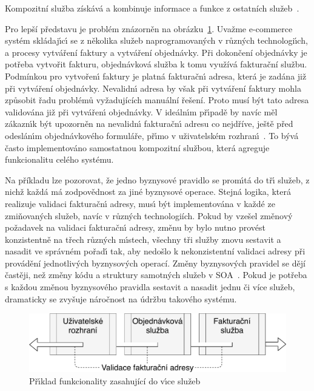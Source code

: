 \begin{definition}
    Kompozitní služba získává a kombinuje informace a funkce z ostatních služeb~\cite{papazoglou2003service}.
\end{definition}

Pro lepší představu je problém znázorněn na obrázku~\ref{fig:service-cutting}. Uvažme e-commerce
systém skládaj\'{\i}c\'{\i} se z několika služeb naprogramovan\'ych v různ\'ych technologi\'{\i}ch, a
procesy vytváření faktury a vytváření objednávky. Při dokončení objednávky je potřeba vytvořit fakturu,
objednávková služba k tomu využívá fakturační službu. Podmínkou pro vytvořen\'{\i} faktury je platná fakturačn\'{\i} adresa,
která je zadána již při vytváření objednávky. Nevalidn\'{\i} adresa by však při vytváření faktury
mohla způsobit řadu problémů vyžadujících manuální řešení. Proto musí být tato adresa validována
již při vytvářen\'{\i} objednávky. V ideáln\'{\i}m př\'{\i}padě by navíc měl zákazn\'{\i}k být upozorněn
na nevalidn\'{\i} fakturačn\'{\i} adresu co nejdříve, ještě před odeslán\'{\i}m objednávkového formuláře,
př\'{\i}mo v uživatelském rozhran\'{\i}~\cite{cemus2017separation}. To bývá často implementováno samostatnou
kompozitní službou, která agreguje funkcionalitu celého systému.

Na příkladu lze pozorovat, že jedno byznysové pravidlo se prom\'{\i}tá
do tř\'{\i} služeb, z nichž každá má zodpovědnost za jiné byznysové operace.
Stejná logika, která realizuje validaci fakturačn\'{\i} adresy,
mus\'{\i} b\'yt implementována v každé ze zmiňovaných služeb, navíc v různých technologiích.
Pokud by vzešel změnový požadavek na validaci fakturačn\'{\i} adresy, změnu by bylo nutno
provést konzistentně na třech různ\'ych m\'{\i}stech, všechny tři služby znovu
sestavit a nasadit ve správném pořad\'{\i} tak, aby nedošlo k nekonzistentní validaci adresy
při provádění jednotlivých byznysových operací. Změny byznysových pravidel se dějí častěji,
než změny kódu a struktury samotných služeb v \gls{SOA}~\cite{rosenberg2005business}.
Pokud je potřeba s každou změnou byznysového pravidla sestavit a nasadit jednu či více služeb,
dramaticky se zvyšuje náročnost na údržbu takového systému.

\begin{figure}
    \centering
    \includegraphics[keepaspectratio=true, width=0.7\linewidth]{figures/service-cutting.pdf}
    \caption{Př\'{\i}klad funkcionality zasahující do v\'{\i}ce služeb}
    \label{fig:service-cutting}
\end{figure}

